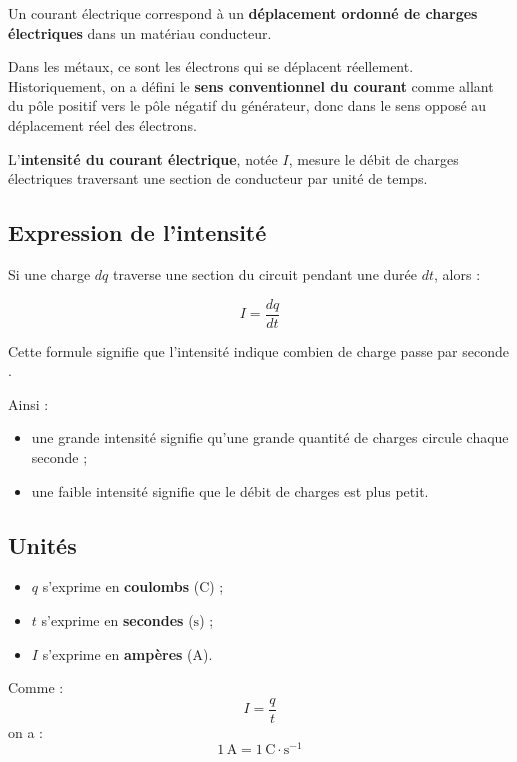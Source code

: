 \documentclass[11pt,a4paper]{article}
\begin{document}
Un courant électrique correspond à un \textbf{déplacement ordonné de charges électriques} dans un matériau conducteur.

Dans les métaux, ce sont les électrons qui se déplacent réellement. Historiquement, on a défini le \textbf{sens conventionnel du courant} comme allant du pôle positif vers le pôle négatif du générateur, donc dans le sens opposé au déplacement réel des électrons.

\begin{definitionbox}
L'\textbf{intensité du courant électrique}, notée \(I\), mesure le débit de charges électriques traversant une section de conducteur par unité de temps.
\end{definitionbox}

\subsection{Expression de l'intensité}

Si une charge \(dq\) traverse une section du circuit pendant une durée \(dt\), alors :

\[
I = \frac{dq}{dt}
\]

\begin{interpretation}
Cette formule signifie que l'intensité indique \og combien de charge passe par seconde \fg. 

Ainsi :
\begin{itemize}
    \item une grande intensité signifie qu'une grande quantité de charges circule chaque seconde ;
    \item une faible intensité signifie que le débit de charges est plus petit.
\end{itemize}
\end{interpretation}

\subsection{Unités}

\begin{itemize}
    \item \(q\) s'exprime en \textbf{coulombs} (\(\text{C}\)) ;
    \item \(t\) s'exprime en \textbf{secondes} (\(\text{s}\)) ;
    \item \(I\) s'exprime en \textbf{ampères} (\(\text{A}\)).
\end{itemize}

Comme :
\[
I = \frac{q}{t}
\]
on a :
\[
1\,\text{A} = 1\,\text{C}\cdot \text{s}^{-1}
\]
\end{document}
